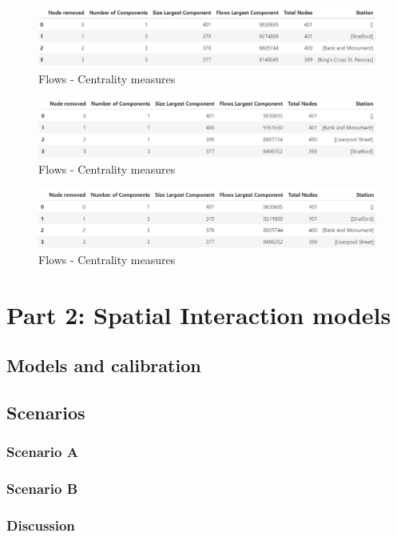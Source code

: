\documentclass[10pt]{report}
\numberwithin{figure}{section}
\numberwithin{table}{section}
\begin{document}
    \begin{figure}[htp]
        \centering
        \includegraphics[width=14cm]{Image/Table_Flows_degree.png}
        \caption{Flows - Centrality measures}
        \label{fig:galaxy}
    \end{figure}

    \begin{figure}[htp]
        \centering
        \includegraphics[width=14cm]{Image/Table_Flows_eigenvector.png}
        \caption{Flows - Centrality measures}
        \label{fig:galaxy}
    \end{figure}


    \begin{figure}[htp]
        \centering
        \includegraphics[width=14cm]{Image/Table_Flows_Betweenness.png}
        \caption{Flows - Centrality measures}
        \label{fig:galaxy}
    \end{figure}

\newpage

\section{ Part 2: Spatial Interaction models}


\subsection{Models and calibration}



\subsection{Scenarios}
\subsubsection{Scenario A}
\subsubsection{Scenario B}
\subsubsection{Discussion}













\newpage
\printbibliography[title = {References}]
\end{document}
